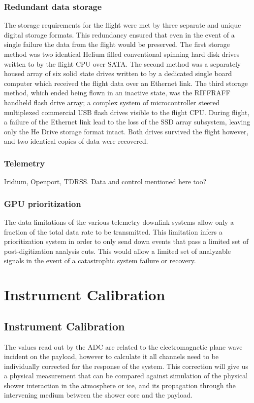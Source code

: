 	\subsection{Redundant data storage}
		The storage requirements for the flight were met by three separate and unique digital storage formats.  This redundancy ensured that even in the event of a single failure the data from the flight would be preserved.  The first storage method was two identical Helium filled conventional spinning hard disk drives written to by the flight CPU over SATA.  The second method was a separately housed array of six solid state drives written to by a dedicated single board computer which received the flight data over an Ethernet link.  The third storage method, which ended being flown in an inactive state, was the RIFFRAFF handheld flash drive array; a complex system of microcontroller steered multiplexed commercial USB flash drives visible to the flight CPU.  During flight, a failure of the Ethernet link lead to the loss of the SSD array subsystem, leaving only the He Drive storage format intact.  Both drives survived the flight however, and two identical copies of data were recovered.
	
	\subsection{Telemetry}
		Iridium, Openport, TDRSS.  Data and control mentioned here too?
		
	\subsection{GPU prioritization}
		The data limitations of the various telemetry downlink systems allow only a fraction of the total data rate to be transmitted.  This limitation infers a prioritization system in order to only send down events that pass a limited set of post-digitization analysis cuts.  This would allow a limited set of analyzable signals in the event of a catastrophic system failure or recovery.
			
\chapter{Instrument Calibration}
\section{Instrument Calibration}
	The values read out by the ADC are related to the electromagnetic plane wave incident on the payload, however to calculate it all channels need to be individually corrected for the response of the system.  This correction will give us a physical measurement that can be compared against simulation of the physical shower interaction in the atmosphere or ice, and its propagation through the intervening medium between the shower core and the payload.
